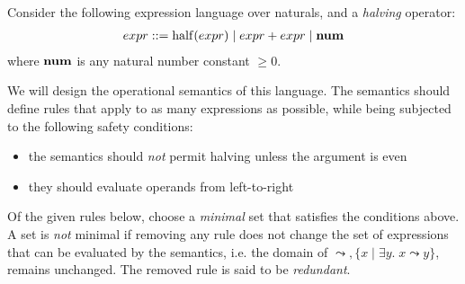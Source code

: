 

\begin{exercise}{}

  Consider the following expression language over naturals, and a \emph{halving}
  operator:
  \begin{align*}
    expr ::= \operatorname{half}(expr) \mid expr + expr \mid \mathbf{num}
  \end{align*}
  where \(\mathbf{num}\) is any natural number constant \(\ge 0\).

  We will design the operational semantics of this language. The semantics
  should define rules that apply to as many expressions as possible, while being
  subjected to the following safety conditions:
  \begin{itemize}
    \item the semantics should \emph{not} permit halving unless the argument is even
    \item they should evaluate operands from left-to-right
  \end{itemize}

  Of the given rules below, choose a \emph{minimal} set that satisfies the
  conditions above. A set is \emph{not} minimal if removing any rule does not
  change the set of expressions that can be evaluated by the semantics, i.e. the
  domain of \(\leadsto, \{x \mid \exists y.\; x \leadsto y\}\), remains
  unchanged. The removed rule is said to be \emph{redundant}.


\end{exercise}

